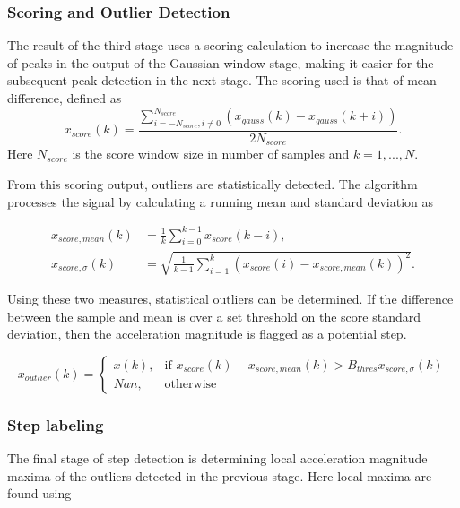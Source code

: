 	

\subsubsection{Scoring and Outlier Detection}
	The result of the third stage uses a scoring calculation to increase the magnitude of peaks in the output of the Gaussian window stage, making it easier for the subsequent peak detection in the next stage.  The scoring used is that of mean difference, defined as 
	\begin{equation}
		x_{score}(k) = \frac{\sum^{N_{score}}_{i=-N_{score}, i \neq 0}\left(x_{gauss}(k)-x_{gauss}(k+i)\right)}{2 N_{score}}.
		\label{eq:mean difference}
	\end{equation}
	Here $N_{score}$ is the score window size in number of samples and $ k = 1,...,N $.\par 

	From this scoring output, outliers are statistically detected. The algorithm processes the signal by calculating a running mean and standard deviation as
	
		\begin{align}\label{key}
		x_{score, mean}(k) &= \frac{1}{k}\sum^{k-1}_{i=0}x_{score}(k-i),\\			
		x_{score,\sigma}(k) &= \sqrt{\frac{1}{k - 1}\sum _{i=1}^{k}\left(x_{score}(i)-x_{score, mean}(k)\right)^{2}}.
	\end{align}
	
	Using these two measures, statistical outliers can be determined. If the difference between the sample and mean is over a set threshold on the score standard deviation, then the acceleration magnitude is flagged as a potential step.
	
	\begin{equation}\label{key}
		x_{outlier}(k) = 
		\begin{cases}
			x(k),& \text{if } x_{score}(k)-x_{score, mean}(k)>B_{thres}x_{score, \sigma}(k)\\
			Nan,              & \text{otherwise}
		\end{cases}
	\end{equation}
	
	
\subsubsection{Step labeling}
	The final stage of step detection is determining local acceleration magnitude maxima of the outliers detected in the previous stage. Here local maxima are found using
	
